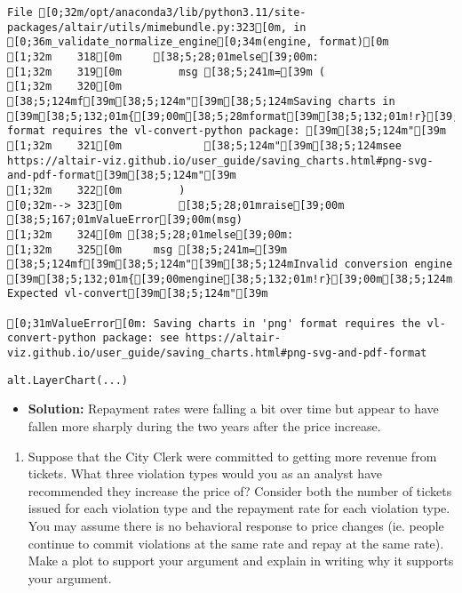 \documentclass[
  letterpaper,
  DIV=11,
  numbers=noendperiod]{scrartcl}
\providecommand{\tightlist}{%
  \setlength{\itemsep}{0pt}\setlength{\parskip}{0pt}}\usepackage{longtable,booktabs,array}
\begin{document}
\begin{verbatim}
File [0;32m/opt/anaconda3/lib/python3.11/site-packages/altair/utils/mimebundle.py:323[0m, in [0;36m_validate_normalize_engine[0;34m(engine, format)[0m
[1;32m    318[0m     [38;5;28;01melse[39;00m:
[1;32m    319[0m         msg [38;5;241m=[39m (
[1;32m    320[0m             [38;5;124mf[39m[38;5;124m"[39m[38;5;124mSaving charts in [39m[38;5;132;01m{[39;00m[38;5;28mformat[39m[38;5;132;01m!r}[39;00m[38;5;124m format requires the vl-convert-python package: [39m[38;5;124m"[39m
[1;32m    321[0m             [38;5;124m"[39m[38;5;124msee https://altair-viz.github.io/user_guide/saving_charts.html#png-svg-and-pdf-format[39m[38;5;124m"[39m
[1;32m    322[0m         )
[0;32m--> 323[0m         [38;5;28;01mraise[39;00m [38;5;167;01mValueError[39;00m(msg)
[1;32m    324[0m [38;5;28;01melse[39;00m:
[1;32m    325[0m     msg [38;5;241m=[39m [38;5;124mf[39m[38;5;124m"[39m[38;5;124mInvalid conversion engine [39m[38;5;132;01m{[39;00mengine[38;5;132;01m!r}[39;00m[38;5;124m. Expected vl-convert[39m[38;5;124m"[39m

[0;31mValueError[0m: Saving charts in 'png' format requires the vl-convert-python package: see https://altair-viz.github.io/user_guide/saving_charts.html#png-svg-and-pdf-format
\end{verbatim}

\begin{verbatim}
alt.LayerChart(...)
\end{verbatim}

\begin{itemize}
\tightlist
\item
  \textbf{Solution:} Repayment rates were falling a bit over time but
  appear to have fallen more sharply during the two years after the
  price increase.
\end{itemize}

\begin{enumerate}
\def\labelenumi{\arabic{enumi}.}
\setcounter{enumi}{5}
\tightlist
\item
  Suppose that the City Clerk were committed to getting more revenue
  from tickets. What three violation types would you as an analyst have
  recommended they increase the price of? Consider both the number of
  tickets issued for each violation type and the repayment rate for each
  violation type. You may assume there is no behavioral response to
  price changes (ie. people continue to commit violations at the same
  rate and repay at the same rate). Make a plot to support your argument
  and explain in writing why it supports your argument.
\end{enumerate}
\end{document}
